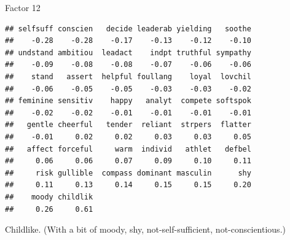 \begin{frame}[fragile]{Factor 12}
  
  {\footnotesize
\begin{knitrout}
\color{fgcolor}\begin{kframe}
\begin{alltt}
\hlstd{mylist[[}\hlstd{]]}
\end{alltt}
\begin{verbatim}
## selfsuff conscien   decide leaderab yielding   soothe 
##    -0.28    -0.28    -0.17    -0.13    -0.12    -0.10 
## undstand ambitiou  leadact    indpt truthful sympathy 
##    -0.09    -0.08    -0.08    -0.07    -0.06    -0.06 
##    stand   assert  helpful foullang    loyal  lovchil 
##    -0.06    -0.05    -0.05    -0.03    -0.03    -0.02 
## feminine sensitiv    happy   analyt  compete softspok 
##    -0.02    -0.02    -0.01    -0.01    -0.01    -0.01 
##   gentle cheerful   tender  reliant  strpers  flatter 
##    -0.01     0.02     0.02     0.03     0.03     0.05 
##   affect forceful     warm  individ   athlet   defbel 
##     0.06     0.06     0.07     0.09     0.10     0.11 
##     risk gullible  compass dominant masculin      shy 
##     0.11     0.13     0.14     0.15     0.15     0.20 
##    moody childlik 
##     0.26     0.61
\end{verbatim}
\end{kframe}
\end{knitrout}
}

Childlike. (With a bit of moody, shy, not-self-sufficient, not-conscientious.)

\end{frame}
